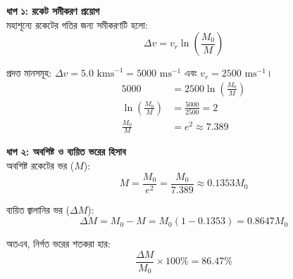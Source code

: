 \documentclass[12pt, a4paper]{article}
\begin{document}
\begin{tcolorbox}[solutionbox={সমাধান (Solution)}]
    \noindent
    \textbf{ধাপ ১: রকেট সমীকরণ প্রয়োগ} \\
    মহাশূন্যে রকেটের গতির জন্য সমীকরণটি হলো:
    \[ \Delta v = v_r \ln\left(\frac{M_0}{M}\right) \]
    
    প্রদত্ত মানসমূহ: $\Delta v = 5.0\text{ kms}^{-1} = 5000\text{ ms}^{-1}$ এবং $v_r = 2500\text{ ms}^{-1}$।
    \begin{align*}
        5000 &= 2500 \ln\left(\frac{M_0}{M}\right) \\
        \ln\left(\frac{M_0}{M}\right) &= \frac{5000}{2500} = 2 \\
        \frac{M_0}{M} &= e^2 \approx 7.389
    \end{align*}
    
    \vspace{0.5em}
    \noindent\textbf{ধাপ ২: অবশিষ্ট ও ব্যয়িত ভরের হিসাব} \\
    অবশিষ্ট রকেটের ভর ($M$):
    \[ M = \frac{M_0}{e^2} = \frac{M_0}{7.389} \approx 0.1353 M_0 \]
    
    ব্যয়িত জ্বালানির ভর ($\Delta M$):
    \[ \Delta M = M_0 - M = M_0 (1 - 0.1353) = 0.8647 M_0 \]
    
    অতএব, নির্গত ভরের শতকরা হার:
    \[ \frac{\Delta M}{M_0} \times 100\% = \mathbf{86.47\%} \]
\end{tcolorbox}
\end{document}
